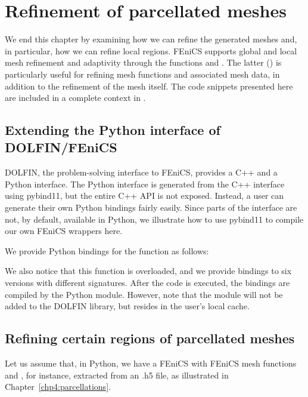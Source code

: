 \section{Refinement of parcellated meshes}
\label{sec:chp4:addparcellations}

We end this chapter by examining how we can refine the generated
meshes and, in particular, how we can refine local regions. FEniCS
supports global and local mesh refinement and adaptivity through the
functions  and . The latter
() is particularly useful for refining mesh
functions and associated mesh data, in addition to the refinement of
the mesh itself. The code snippets presented here are included in
a complete context in . 

\subsection{Extending the Python interface of DOLFIN/FEniCS}
DOLFIN, the problem-solving interface to FEniCS, provides a C++ and a
Python interface. The Python interface is generated from the C++
interface using pybind11, but the entire C++ API is not
exposed. Instead, a user can generate their own Python bindings fairly
easily. Since parts of the  interface are not, by
default, available in Python, we illustrate how to use pybind11 to
compile our own FEniCS wrappers here.

We provide Python bindings for the  function as follows: 

We also notice that this function is overloaded, and we provide
bindings to six versions with different signatures. After the code is
executed, the bindings are compiled by the Python module. However,
note that the module will not be added to the DOLFIN library, but
resides in the user's local cache.

\subsection{Refining certain regions of parcellated meshes}
Let us assume that, in Python, we have a FEniCS  with FEniCS
mesh functions  and , for instance,
extracted from an .h5 file, as illustrated in Chapter~\ref{chp4:parcellations}. 

